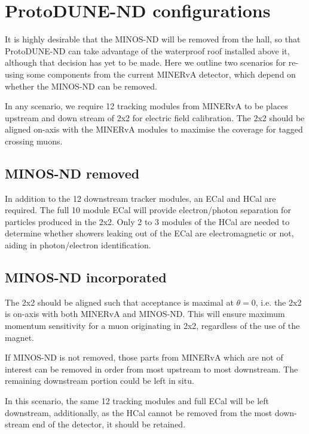 \section{ProtoDUNE-ND configurations}
\label{sec:configurations}


It is highly desirable that the MINOS-ND will be removed from the hall, so that ProtoDUNE-ND can take advantage of the waterproof roof installed above it, although that decision has yet to be made. Here we outline two scenarios for re-using some components from the current MINERvA detector, which depend on whether the MINOS-ND can be removed.

In any scenario, we require 12 tracking modules from MINERvA to be places upstream and down stream of 2x2 for electric field calibration. The 2x2 should be aligned on-axis with the MINERvA modules to maximise the coverage for tagged crossing muons. 

\subsection{MINOS-ND removed}

In addition to the 12 downstream tracker modules, an ECal and HCal are required. The full 10 module ECal will provide electron/photon separation for particles produced in the 2x2. Only 2 to 3 modules of the HCal are needed to determine whether showers leaking out of the ECal are electromagnetic or not, aiding in photon/electron identification.

\subsection{MINOS-ND incorporated}

The 2x2 should be aligned such that acceptance is maximal at $\theta=0$, i.e. the 2x2 is on-axis with both MINERvA and MINOS-ND. This will ensure maximum momentum sensitivity for a muon originating in 2x2, regardless of the use of the magnet. 

If MINOS-ND is not removed, those parts from MINERvA which are not of interest can be removed in order from most upstream to most downstream. The remaining downstream portion could be left in situ.

In this scenario, the same 12 tracking modules and full
ECal will be left downstream, additionally, as the HCal cannot be removed from the most down-stream end of the detector, it should be retained.
